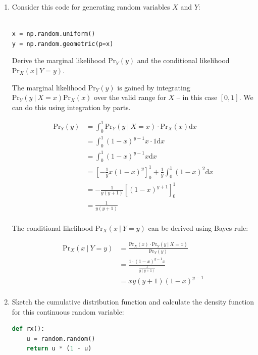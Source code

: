 \documentclass[10pt,\jkfside,a4paper]{article}
\begin{document}
\begin{enumerate}
\item Consider this code for generating random variables $X$ and $Y$:

\begin{lstlisting}[language=Python]

x = np.random.uniform()
y = np.random.geometric(p=x)

\end{lstlisting}

Derive the marginal likelihood $\text{Pr}_Y(y)$ and the conditional
likelihood $\text{Pr}_X(x \ | \ Y = y)$.

The marginal likelihood $\text{Pr}_Y(y)$ is gained by integrating
$\text{Pr}_Y(y \ | \ X = x)\text{Pr}_X(x)$ over the valid range for $X$ --
in this case $[0, 1]$. We can do this using integration by parts.

\[
\begin{split}
\text{Pr}_Y(y)
&= \int^1_0 \text{Pr}_Y(y \ | \ X = x) \cdot \text{Pr}_X(x) \text{d}x \\
&= \int^1_0 (1 - x)^{y - 1}x \cdot 1 \text{d}x \\
&= \int^1_0 (1 - x)^{y - 1}x \text{d}x \\
&= \left[ - \frac{1}{y} x(1 - x)^y\right]^1_0 + \frac{1}{y}\int^1_0 (1 - x)
^2 \text{d}x \\
&= -\frac{1}{y(y + 1)}\left[ (1 - x)^{y + 1} \right]^1_0 \\
&= \frac{1}{y(y + 1)} \\
\end{split}
\]

The conditional likelihood $\text{Pr}_X(x \ | \ Y = y)$ can be derived using
Bayes rule:

\[
\begin{split}
\text{Pr}_X(x \ | \ Y = y)
&= \frac{\text{Pr}_X(x)\cdot\text{Pr}_Y(y \ | \ X = x)}{\text{Pr}_Y(y)} \\
&= \frac{1 \cdot (1 - x)^{y - 1}x}{\frac{1}{y(y + 1)}} \\
&= xy(y + 1)(1 - x)^{y-1} \\
\end{split}
\]

\iffalse

\item Sketch the cumulative distribution function and calculate the density
function for this continuous random variable:

\begin{lstlisting}[language=Python]
def rx():
	u = random.random()
	return u * (1 - u)
\end{lstlisting}


\end{enumerate}
\end{document}

